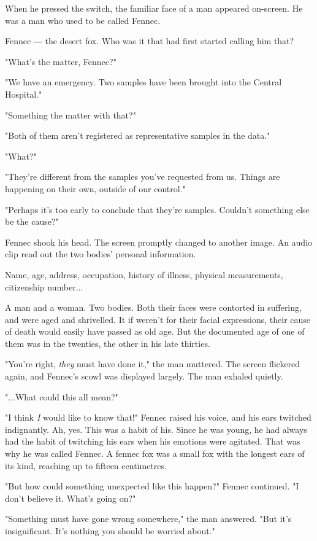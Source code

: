 When he pressed the switch, the familiar face of a man appeared
on-screen. He was a man who used to be called Fennec.

Fennec ― the desert fox. Who was it that had first started calling him
that?

"What's the matter, Fennec?"

"We have an emergency. Two samples have been brought into the Central
Hospital."

"Something the matter with that?"

"Both of them aren't registered as representative samples in the data."

"What?"

"They're different from the samples you've requested from us. Things are
happening on their own, outside of our control."

"Perhaps it's too early to conclude that they're samples. Couldn't
something else be the cause?"

Fennec shook his head. The screen promptly changed to another image. An
audio clip read out the two bodies' personal information.

Name, age, address, occupation, history of illness, physical
measurements, citizenship number...

A man and a woman. Two bodies. Both their faces were contorted in
suffering, and were aged and shrivelled. It if weren't for their facial
expressions, their cause of death would easily have passed as old age.
But the documented age of one of them was in the twenties, the other in
his late thirties.

"You're right, \emph{they} must have done it," the man muttered. The screen
flickered again, and Fennec's scowl was displayed largely. The man
exhaled quietly.

"...What could this all mean?"

"I think \emph{I} would like to know that!" Fennec raised his voice, and his
ears twitched indignantly. Ah, yes. This was a habit of his. Since he
was young, he had always had the habit of twitching his ears when his
emotions were agitated. That was why he was called Fennec. A fennec fox
was a small fox with the longest ears of its kind, reaching up to
fifteen centimetres.

"But how could something unexpected like this happen?" Fennec continued.
"I don't believe it. What's going on?"

"Something must have gone wrong somewhere," the man answered. "But it's
insignificant. It's nothing you should be worried about."

